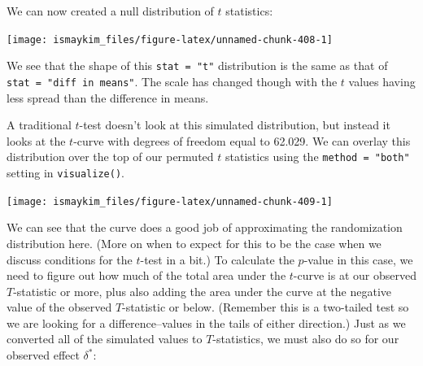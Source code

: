 \documentclass[12pt,]{krantz}
\makeatletter
\newenvironment{Shaded}{\begin{snugshade}}{\end{snugshade}}
\newcommand{\KeywordTok}[1]{\textcolor[rgb]{0.27,0.27,0.27}{\textbf{#1}}}
\newcommand{\DataTypeTok}[1]{\textcolor[rgb]{0.27,0.27,0.27}{#1}}
\newcommand{\StringTok}[1]{\textcolor[rgb]{0.5,0.5,0.5}{#1}}
\newcommand{\OperatorTok}[1]{\textcolor[rgb]{0.43,0.43,0.43}{\textbf{#1}}}
\newcommand{\NormalTok}[1]{#1}
\newenvironment{kframe}{%
\medskip{}
\setlength{\fboxsep}{.8em}
 \def\at@end@of@kframe{}%
 \ifinner\ifhmode%
  \def\at@end@of@kframe{\end{minipage}}%
  \begin{minipage}{\columnwidth}%
 \fi\fi%
 \def\FrameCommand##1{\hskip\@totalleftmargin \hskip-\fboxsep
 \colorbox{shadecolor}{##1}\hskip-\fboxsep
     \hskip-\linewidth \hskip-\@totalleftmargin \hskip\columnwidth}%
 \MakeFramed {\advance\hsize-\width
   \@totalleftmargin\z@ \linewidth\hsize
   \@setminipage}}%
 {\par\unskip\endMakeFramed%
 \at@end@of@kframe}
\renewenvironment{Shaded}{\begin{kframe}}{\end{kframe}}
\theoremstyle{definition}
\theoremstyle{definition}
\theoremstyle{definition}
\theoremstyle{remark}
\makeatother
\begin{document}
We can now created a null distribution of \(t\) statistics:

\begin{Shaded}
\end{Shaded}

\begin{center}\texttt{[image: ismaykim\_files/figure-latex/unnamed-chunk-408-1]} \end{center}

We see that the shape of this \texttt{stat\ =\ "t"} distribution is the
same as that of \texttt{stat\ =\ "diff\ in\ means"}. The scale has
changed though with the \(t\) values having less spread than the
difference in means.

A traditional \(t\)-test doesn't look at this simulated distribution,
but instead it looks at the \(t\)-curve with degrees of freedom equal to
62.029. We can overlay this distribution over the top of our permuted
\(t\) statistics using the \texttt{method\ =\ "both"} setting in
\texttt{visualize()}.

\begin{Shaded}
\end{Shaded}

\begin{center}\texttt{[image: ismaykim\_files/figure-latex/unnamed-chunk-409-1]} \end{center}

We can see that the curve does a good job of approximating the
randomization distribution here. (More on when to expect for this to be
the case when we discuss conditions for the \(t\)-test in a bit.) To
calculate the \(p\)-value in this case, we need to figure out how much
of the total area under the \(t\)-curve is at our observed
\(T\)-statistic or more, plus also adding the area under the curve at
the negative value of the observed \(T\)-statistic or below. (Remember
this is a two-tailed test so we are looking for a difference--values in
the tails of either direction.) Just as we converted all of the
simulated values to \(T\)-statistics, we must also do so for our
observed effect \(\delta^*\):
\end{document}
